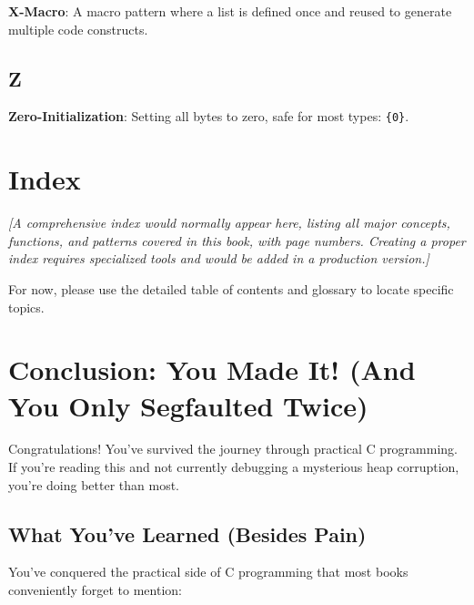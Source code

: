 \documentclass[10pt,openany]{book}
\begin{document}
\textbf{X-Macro}: A macro pattern where a list is defined once and reused to generate multiple code constructs.

\section*{Z}

\textbf{Zero-Initialization}: Setting all bytes to zero, safe for most types: \texttt{\{0\}}.

\chapter{Index}

\textit{[A comprehensive index would normally appear here, listing all major concepts, functions, and patterns covered in this book, with page numbers. Creating a proper index requires specialized tools and would be added in a production version.]}

\vspace{2em}

For now, please use the detailed table of contents and glossary to locate specific topics.

\chapter{Conclusion: You Made It! (And You Only Segfaulted Twice)}

Congratulations! You've survived the journey through practical C programming. If you're reading this and not currently debugging a mysterious heap corruption, you're doing better than most.

\section*{What You've Learned (Besides Pain)}

You've conquered the practical side of C programming that most books conveniently forget to mention:
\end{document}
